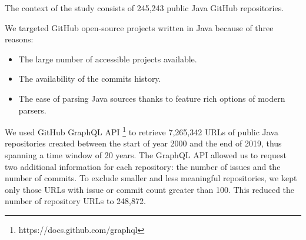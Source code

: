 



The context of the study consists of 245,243 public Java GitHub repositories. 

We targeted GitHub open-source projects written in Java because of three reasons:
\begin{itemize}
    \item The large number of accessible projects available.
    \item The availability of the commits history. 
    \item The ease of parsing Java sources thanks to feature rich options of modern parsers.
\end{itemize}
We used GitHub GraphQL API \footnote{https://docs.github.com/graphql} to retrieve 7,265,342 URLs of public Java repositories created between the start of year 2000 and the end of 2019, thus spanning a time window of 20 years.
The GraphQL API allowed us to request two additional information for each repository: the number of issues and the number of commits. To exclude smaller and less meaningful repositories, we kept only those URLs with issue or commit count greater than 100. This reduced the number of repository URLs to 248,872.

